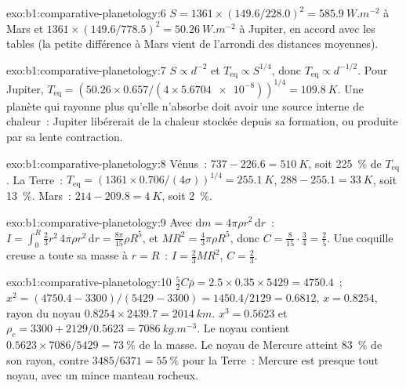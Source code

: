 \begin{solution}{exo:b1:comparative-planetology:6}
$S = 1361\times(149.6/228.0)^2 = \qty{585.9}{W.m^{-2}}$ à Mars et
$1361\times(149.6/778.5)^2 = \qty{50.26}{W.m^{-2}}$ à Jupiter, en accord
avec les tables (la petite différence à Mars vient de l'arrondi des distances
moyennes).
\end{solution}

\begin{solution}{exo:b1:comparative-planetology:7}
$S \propto d^{-2}$ et $T_\mathrm{eq} \propto S^{1/4}$, donc $T_\mathrm{eq}
\propto d^{-1/2}$. Pour Jupiter, $T_\mathrm{eq} = (50.26\times0.657/(4\times
\num{5.6704e-8}))^{1/4} = \qty{109.8}{K}$. Une planète qui rayonne plus qu'elle
n'absorbe doit avoir une source interne de chaleur~: Jupiter libérerait de la
chaleur stockée depuis sa formation, ou produite par sa lente contraction.
\end{solution}

\begin{solution}{exo:b1:comparative-planetology:8}
Vénus~: $737 - 226.6 = \qty{510}{K}$, soit \qty{225}{\percent} de $T_\mathrm{eq}$.
La Terre~: $T_\mathrm{eq} = (1361\times0.706/(4\sigma))^{1/4} = \qty{255.1}{K}$,
$288 - 255.1 = \qty{33}{K}$, soit \qty{13}{\percent}. Mars~: $214 - 209.8 =
\qty{4}{K}$, soit \qty{2}{\percent}.
\end{solution}

\begin{solution}{exo:b1:comparative-planetology:9}
Avec $\mathrm dm = 4\pi\rho r^2\,\mathrm dr$~: $I = \int_0^R\tfrac23r^2\,4\pi
\rho r^2\,\mathrm dr = \tfrac{8\pi}{15}\rho R^5$, et $MR^2 = \tfrac43\pi\rho
R^5$, donc $C = \tfrac{8}{15}\cdot\tfrac34 = \tfrac25$. Une coquille creuse a
toute sa masse à $r = R$~: $I = \tfrac23MR^2$, $C = \tfrac23$.
\end{solution}

\begin{solution}{exo:b1:comparative-planetology:10}
$\tfrac52C\bar\rho = 2.5\times0.35\times5429 = 4750.4$~;
$x^2 = (4750.4 - 3300)/(5429 - 3300) = 1450.4/2129 = 0.6812$, $x = 0.8254$,
rayon du noyau $0.8254\times2439.7 = \qty{2014}{km}$. $x^3 = 0.5623$ et
$\rho_c = 3300 + 2129/0.5623 = \qty{7086}{kg.m^{-3}}$. Le noyau contient
$0.5623\times7086/5429 = \qty{73}{\percent}$ de la masse. Le noyau de Mercure
atteint \qty{83}{\percent} de son rayon, contre $3485/6371 =
\qty{55}{\percent}$ pour la Terre~: Mercure est presque tout noyau, avec un
mince manteau rocheux.
\end{solution}

